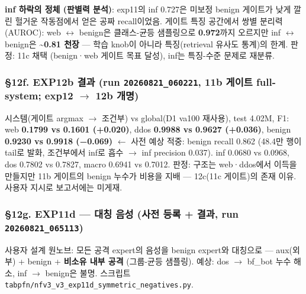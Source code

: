 \textbf{inf 하락의 정체 (판별력 분석)}: exp11의 inf 0.727은 미보정 benign 게이트가 낮게 깔린 헐거운 작동점에서 얻은 공짜 recall이었음. 게이트 특징 공간에서 쌍별 분리력(AUROC): web \ensuremath{\leftrightarrow} benign은 클래스-균등 샘플링으로 \textbf{0.972}까지 오르지만 inf \ensuremath{\leftrightarrow} benign은 \textbf{\textasciitilde{}0.81 천장} — 학습 knob이 아니라 특징(retrieval 유사도 통계)의 한계. 판정: 11c 채택 (benign·web 게이트 목표 달성), inf는 특징-수준 문제로 재분류.

\subsubsection{§12f. EXP12b 결과 (run \texttt{20260821\allowbreak{}\_\allowbreak{}\allowbreak{}060221}, 11b 게이트 full-system; exp12 \ensuremath{\rightarrow} 12b 개명)}
시스템(게이트 argmax \ensuremath{\rightarrow} 조건부) vs global(D1 va100 재사용), test 4.02M, F1: web \textbf{0.1799 vs 0.1601 (+\allowbreak{}0.020)}, ddos \textbf{0.9988 vs 0.9627 (+\allowbreak{}0.036)}, benign \textbf{0.9230 vs 0.9918 (−0.069)} \ensuremath{\leftarrow} 사전 예상 적중: benign recall 0.862 (48.4만 행이 tail로 발화, 조건부에서 inf로 흡수  \ensuremath{\rightarrow}  inf precision 0.037). inf 0.0680 vs 0.0968, dos 0.7802 vs 0.7827, macro 0.6941 vs 0.7012. 판정: 구조는 web·ddos에서 이득을 만들지만 11b 게이트의 benign 누수가 비용을 지배 — 12c(11c 게이트)의 존재 이유. 사용자 지시로 보고서에는 미게재.

\subsubsection{§12g. EXP11d — 대칭 음성 (사전 등록 +\allowbreak{} 결과, run \texttt{20260821\allowbreak{}\_\allowbreak{}\allowbreak{}065113})}
사용자 설계 원노브: 모든 공격 expert의 음성을 benign expert와 대칭으로 — aux(외부) +\allowbreak{} benign +\allowbreak{} \textbf{비소유 내부 공격} (그룹-균등 샘플링). 예상: dos \ensuremath{\rightarrow} bf\_\allowbreak{}bot 누수 해소, inf \ensuremath{\rightarrow} benign은 불명. 스크립트 \texttt{tabpfn/\allowbreak{}\allowbreak{}n\allowbreak{}fv3\_\allowbreak{}\allowbreak{}v3\_\allowbreak{}\allowbreak{}e\allowbreak{}xp11d\_\allowbreak{}\allowbreak{}sy\allowbreak{}mmetric\_\allowbreak{}\allowbreak{}negative\allowbreak{}s.\allowbreak{}py}.

